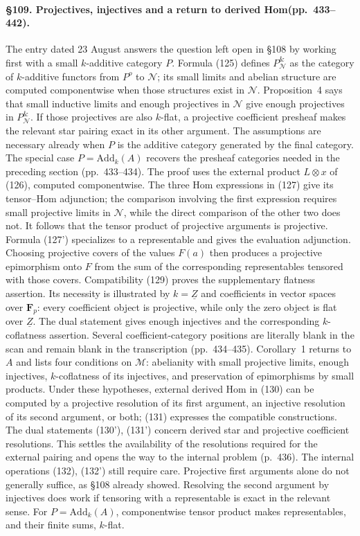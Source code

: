 \paragraph{\S109. Projectives, injectives and a return to derived Hom\newline (pp.\ 433--442).}
The entry dated 23 August answers the question left open in \S108 by working first with a small $k$-additive category $P$. Formula (125) defines $P^{\&}_{\mathcal N}$ as the category of $k$-additive functors from $P^o$ to $\mathcal N$; its small limits and abelian structure are computed componentwise when those structures exist in $\mathcal N$. Proposition~4 says that small inductive limits and enough projectives in $\mathcal N$ give enough projectives in $P^{\&}_{\mathcal N}$. If those projectives are also $k$-flat, a projective coefficient presheaf makes the relevant star pairing exact in its other argument. The assumptions are necessary already when $P$ is the additive category generated by the final category. The special case $P=\mathrm{Add}_k(A)$ recovers the presheaf categories needed in the preceding section (pp.\ 433--434). The proof uses the external product $L\otimes x$ of (126), computed componentwise. The three Hom expressions in (127) give its tensor--Hom adjunction; the comparison involving the first expression requires small projective limits in $\mathcal N$, while the direct comparison of the other two does not. It follows that the tensor product of projective arguments is projective. Formula (127') specializes to a representable and gives the evaluation adjunction. Choosing projective covers of the values $F(a)$ then produces a projective epimorphism onto $F$ from the sum of the corresponding representables tensored with those covers. Compatibility (129) proves the supplementary flatness assertion. Its necessity is illustrated by $k=\underline Z$ and coefficients in vector spaces over $\mathbf F_p$: every coefficient object is projective, while only the zero object is flat over $\underline Z$. The dual statement gives enough injectives and the corresponding $k$-coflatness assertion. Several coefficient-category positions are literally blank in the scan and remain blank in the transcription (pp.\ 434--435). Corollary~1 returns to $A$ and lists four conditions on $\mathcal M$: abelianity with small projective limits, enough injectives, $k$-coflatness of its injectives, and preservation of epimorphisms by small products. Under these hypotheses, external derived Hom in (130) can be computed by a projective resolution of its first argument, an injective resolution of its second argument, or both; (131) expresses the compatible constructions. The dual statements (130'), (131') concern derived star and projective coefficient resolutions. This settles the availability of the resolutions required for the external pairing and opens the way to the internal problem (p.\ 436). The internal operations (132), (132') still require care. Projective first arguments alone do not generally suffice, as \S108 already showed. Resolving the second argument by injectives does work if tensoring with a representable is exact in the relevant sense. For $P=\mathrm{Add}_k(A)$, componentwise tensor product makes representables, and their finite sums, $k$-flat. 